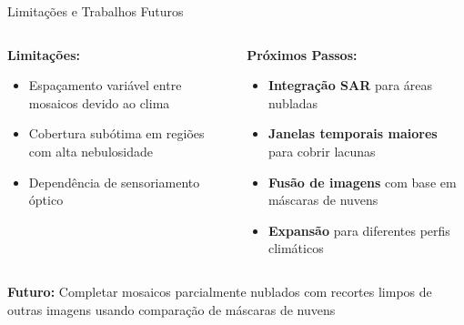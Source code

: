 \documentclass[aspectratio=169,11pt]{beamer}
\begin{document}
\begin{frame}{Limitações e Trabalhos Futuros}
\begin{columns}[T]
    \begin{column}{0.48\textwidth}
        \textbf{\color{accent}Limitações:}
        \begin{itemize}
            \item Espaçamento variável entre mosaicos devido ao clima
            \item Cobertura subótima em regiões com alta nebulosidade
            \item Dependência de sensoriamento óptico
        \end{itemize}
    \end{column}
    \begin{column}{0.48\textwidth}
        \textbf{\color{ufal}Próximos Passos:}
        \begin{itemize}
            \item \textbf{Integração SAR} para áreas nubladas
            \item \textbf{Janelas temporais maiores} para cobrir lacunas
            \item \textbf{Fusão de imagens} com base em máscaras de nuvens
            \item \textbf{Expansão} para diferentes perfis climáticos
        \end{itemize}
    \end{column}
\end{columns}

\vspace{0.3cm}
\begin{center}
    \colorbox{success!10}{\parbox{10cm}{\centering
        \textbf{Futuro:} Completar mosaicos parcialmente nublados com recortes limpos de outras imagens usando comparação de máscaras de nuvens
    }}
\end{center}
\end{frame}
\end{document}
